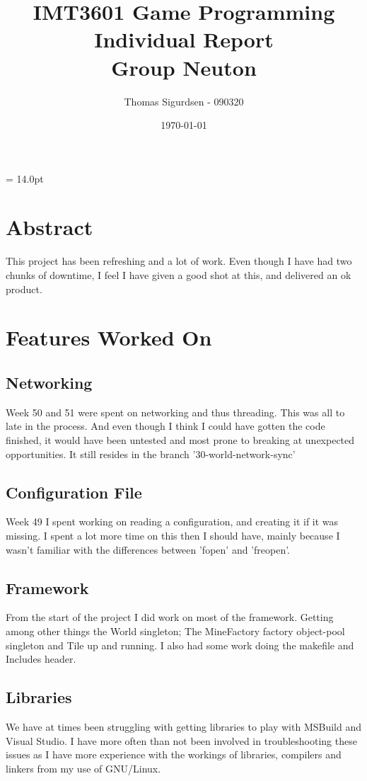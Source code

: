 \documentclass[a4paper,twoside]{article}
\author{Thomas Sigurdsen - 090320}
\title{IMT3601 Game Programming \\ Individual Report \\ Group Neuton}
\date{\today}
\begin{document}
\headheight = 14.0pt
\pagestyle{fancy}
\maketitle
\section*{Abstract}
This project has been refreshing and a lot of work. Even though I have had two
chunks of downtime, I feel I have given a good shot at this, and delivered an ok
product.

\section{Features Worked On}
\subsection{Networking}
Week 50 and 51 were spent on networking and thus threading. This was all to late 
in the process. And even though I think I could have gotten the code finished,
it would have been untested and most prone to breaking at unexpected opportunities.
It still resides in the branch '30-world-network-sync'

\subsection{Configuration File}
Week 49 I spent working on reading a configuration, and creating it if it was 
missing. I spent a lot more time on this then I should have, mainly because I
wasn't familiar with the differences between 'fopen' and 'freopen'.

\subsection{Framework}
From the start of the project I did work on most of the framework. Getting among 
other things the World singleton; The MineFactory factory object-pool singleton
and Tile up and running. I also had some work doing the makefile and Includes
header.

\subsection{Libraries}
We have at times been struggling with getting libraries to play with MSBuild and
Visual Studio. I have more often than not been involved in troubleshooting these
issues as I have more experience with the workings of libraries, compilers and
linkers from my use of GNU/Linux.
\end{document}
